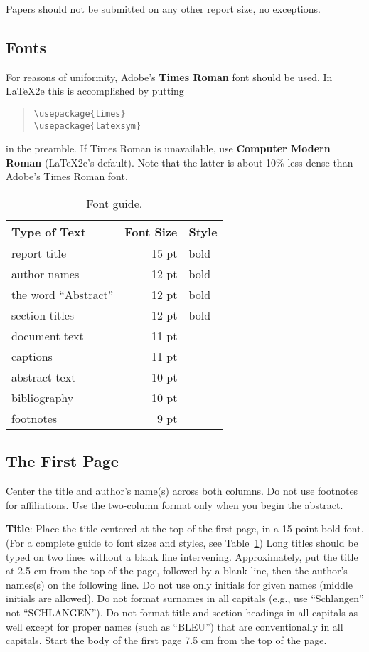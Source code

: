 \documentclass[11pt]{article}
\begin{document}
\noindent Papers should not be submitted on any other report size, no exceptions.


\subsection{Fonts}

For reasons of uniformity, Adobe's {\bf Times Roman} font should be
used. In \LaTeX2e{} this is accomplished by putting

\begin{quote}
\begin{verbatim}
\usepackage{times}
\usepackage{latexsym}
\end{verbatim}
\end{quote}
in the preamble. If Times Roman is unavailable, use {\bf Computer
  Modern Roman} (\LaTeX2e{}'s default).  Note that the latter is about
  10\% less dense than Adobe's Times Roman font.


\begin{table}[h]
\begin{center}
\begin{tabular}{|l|rl|}
\hline \bf Type of Text & \bf Font Size & \bf Style \\ \hline
report title & 15 pt & bold \\
author names & 12 pt & bold \\
the word ``Abstract'' & 12 pt & bold \\
section titles & 12 pt & bold \\
document text & 11 pt  &\\
captions & 11 pt & \\
abstract text & 10 pt & \\
bibliography & 10 pt & \\
footnotes & 9 pt & \\
\hline
\end{tabular}
\end{center}
\caption{\label{font-table} Font guide.}
\end{table}

\subsection{The First Page}
\label{ssec:first}

Center the title and author's name(s) across both
columns. Do not use footnotes for affiliations. Use the
two-column format only when you begin the abstract.

{\bf Title}: Place the title centered at the top of the first page, in
a 15-point bold font. (For a complete guide to font sizes and styles,
see Table~\ref{font-table}) Long titles should be typed on two lines
without a blank line intervening. Approximately, put the title at 2.5
cm from the top of the page, followed by a blank line, then the
author's names(s) on the following line. Do not
use only initials for given names (middle initials are allowed). Do
not format surnames in all capitals (e.g., use ``Schlangen'' not
``SCHLANGEN'').  Do not format title and section headings in all
capitals as well except for proper names (such as ``BLEU'') that are
conventionally in all capitals. Start the body of the first page 7.5 cm from the top of the
page.
\end{document}

